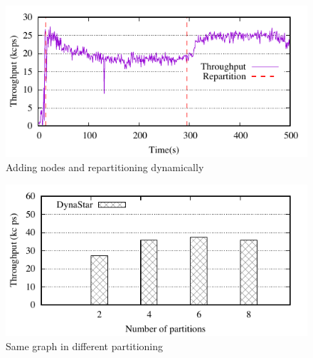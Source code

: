 \begin{figure}[ht]
	\includegraphics{figures/experiments/dynamicload-tp-move-4p}
	\caption{Adding nodes and repartitioning dynamically}
	\label{fig:dynamic_load_tput}
\end{figure}

\begin{figure}[ht]
	\includegraphics{figures/experiments/throughput-avg-vary-partition}
	\caption{Same graph in different partitioning}
	\label{fig:4p1p_varying_partition_size}
\end{figure}



\label{sec:evaluation:strongloc}


